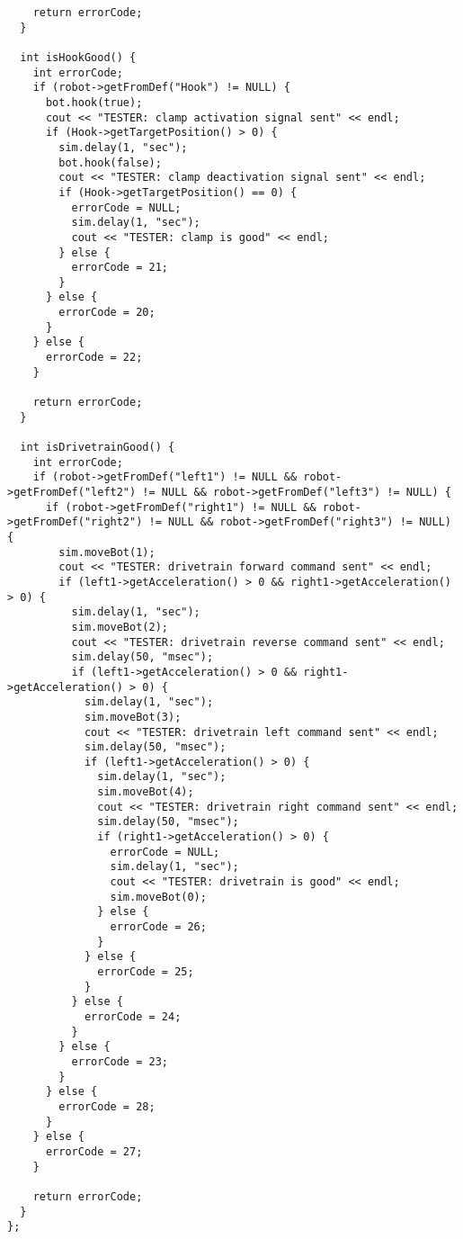 \begin{verbatim}
    return errorCode;
  }
 
  int isHookGood() {
    int errorCode;
    if (robot->getFromDef("Hook") != NULL) {
      bot.hook(true);
      cout << "TESTER: clamp activation signal sent" << endl;
      if (Hook->getTargetPosition() > 0) {
        sim.delay(1, "sec");
        bot.hook(false);
        cout << "TESTER: clamp deactivation signal sent" << endl;
        if (Hook->getTargetPosition() == 0) {
          errorCode = NULL;
          sim.delay(1, "sec");
          cout << "TESTER: clamp is good" << endl;
        } else {
          errorCode = 21;
        }
      } else {
        errorCode = 20;
      }
    } else {
      errorCode = 22;
    }
 
    return errorCode;
  }
 
  int isDrivetrainGood() {
    int errorCode;
    if (robot->getFromDef("left1") != NULL && robot->getFromDef("left2") != NULL && robot->getFromDef("left3") != NULL) {
      if (robot->getFromDef("right1") != NULL && robot->getFromDef("right2") != NULL && robot->getFromDef("right3") != NULL) {
        sim.moveBot(1);
        cout << "TESTER: drivetrain forward command sent" << endl;
        if (left1->getAcceleration() > 0 && right1->getAcceleration() > 0) {
          sim.delay(1, "sec");
          sim.moveBot(2);
          cout << "TESTER: drivetrain reverse command sent" << endl;
          sim.delay(50, "msec");
          if (left1->getAcceleration() > 0 && right1->getAcceleration() > 0) {
            sim.delay(1, "sec");
            sim.moveBot(3);
            cout << "TESTER: drivetrain left command sent" << endl;
            sim.delay(50, "msec");
            if (left1->getAcceleration() > 0) {
              sim.delay(1, "sec");
              sim.moveBot(4);
              cout << "TESTER: drivetrain right command sent" << endl;
              sim.delay(50, "msec");
              if (right1->getAcceleration() > 0) {
                errorCode = NULL;
                sim.delay(1, "sec");
                cout << "TESTER: drivetrain is good" << endl;
                sim.moveBot(0);
              } else {
                errorCode = 26;
              }
            } else {
              errorCode = 25;
            }
          } else {
            errorCode = 24;
          }
        } else {
          errorCode = 23;
        }
      } else {
        errorCode = 28;
      }
    } else {
      errorCode = 27;
    }
 
    return errorCode;
  }
};
\end{verbatim}
